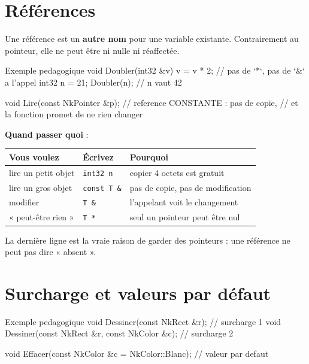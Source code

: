 \section{Références}

Une référence est un \textbf{autre nom} pour une variable existante. Contrairement
au pointeur, elle ne peut être ni nulle ni réaffectée.

\begin{nkcode}{Exemple pedagogique}
void Doubler(int32 &v) { v = v * 2; }   // pas de `*`, pas de `&` a l'appel
int32 n = 21;
Doubler(n);                              // n vaut 42

void Lire(const NkPointer &p);           // reference CONSTANTE : pas de copie,
                                         // et la fonction promet de ne rien changer
\end{nkcode}

\begin{nkretenir}
\textbf{Quand passer quoi} :

\begin{center}
\begin{tabular}{@{}lll@{}}
\toprule
\textbf{Vous voulez} & \textbf{Écrivez} & \textbf{Pourquoi} \\
\midrule
lire un petit objet & \texttt{int32 n} & copier 4 octets est gratuit \\
lire un gros objet & \texttt{const T \&} & pas de copie, pas de modification \\
modifier & \texttt{T \&} & l'appelant voit le changement \\
« peut-être rien » & \texttt{T *} & seul un pointeur peut être nul \\
\bottomrule
\end{tabular}
\end{center}

La dernière ligne est la vraie raison de garder des pointeurs : une référence ne
peut pas dire « absent ».
\end{nkretenir}

\section{Surcharge et valeurs par défaut}

\begin{nkcode}{Exemple pedagogique}
void Dessiner(const NkRect &r);                       // surcharge 1
void Dessiner(const NkRect &r, const NkColor &c);     // surcharge 2

void Effacer(const NkColor &c = NkColor::Blanc);      // valeur par defaut
\end{nkcode}

